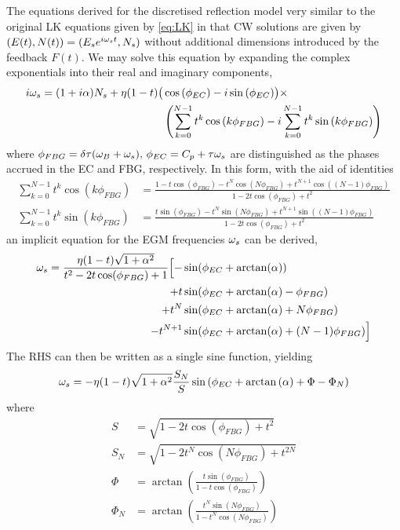 %
The equations derived for the discretised reflection model very similar to the original LK equations given by \eqref{eq:LK} in that CW solutions are given by $(E(t), N(t)) = (E_s e^{i\omega_s t}, N_s)$ without additional dimensions introduced by the feedback $F(t)$. We may solve this equation by expanding the complex exponentials into their real and imaginary components,
%
\begin{align*}
    i \omega_s =(1+i \alpha) N_s + \eta (1-t) \big(&\cos{(\phi_{EC})} -i\sin{(\phi_{EC})}  \big) \times \\ &\left( \sum_{k=0}^{N-1} t^k \cos{(k\phi_{FBG})} - i \sum_{k=0}^{N-1} t^k \sin{(k\phi_{FBG})} \right)
\end{align*}
%
where $\phi_{FBG} = \delta \tau(\omega_B + \omega_s), \, \phi_{EC} = C_p+\tau \omega_s$ are distinguished as the phases accrued in the EC and FBG, respectively. In this form, with the aid of identities
%
\begin{align*}
    \sum_{k=0}^{N-1} t^k \cos(k\phi_{FBG}) &= \frac{1 - t \cos(\phi_{FBG}) - t^N \cos(N\phi_{FBG}) + t^{N+1} \cos((N-1)\phi_{FBG})}{1 - 2t \cos(\phi_{FBG}) + t^2} \\
    \sum_{k=0}^{N-1} t^k \sin(k\phi_{FBG}) &= \frac{t \sin(\phi_{FBG}) - t^N \sin(N\phi_{FBG}) + t^{N+1} \sin((N-1)\phi_{FBG})}{1 - 2t \cos(\phi_{FBG}) + t^2}
\end{align*}
%
an implicit equation for the EGM frequencies $\omega_s$ can be derived,
%
\begin{gather*}
    \begin{aligned}
\omega_s = \frac{\eta (1-t) \sqrt{1 + \alpha^2}}{t^2 - 2 t  \cos(\phi_{FBG}) + 1} \Big[ - &\sin(\phi_{EC} + \arctan(\alpha)) \\
     +  t&\sin(\phi_{EC} + \arctan(\alpha) - \phi_{FBG}) \\
     + t^N&\sin(\phi_{EC} + \arctan(\alpha) + N \phi_{FBG})   \\
     -  t^{N+1}&\sin(\phi_{EC} + \arctan(\alpha) + (N-1) \phi_{FBG})
\Big]
\end{aligned}
\end{gather*}
%
The RHS can then be written as a single sine function, yielding
%
\begin{equation}
    \label{eq:discretised_ws}
    \omega_s = -\eta (1-t) \sqrt{1+\alpha^2}\frac{S_N}{S} \sin{\left( \phi_{EC}+\arctan{(\alpha) + \Phi - \Phi_N } \right)}
\end{equation}
%
where
%
\begin{align}
    S &= \sqrt{1 - 2 t \cos{(\phi_{FBG}) + t^2}}
    \\
    S_N &= \sqrt{1 - 2 t^N \cos{(N\phi_{FBG}) + t^{2N}}}
    \\
    \Phi &= \arctan{\left( \frac{t \sin{(\phi_{FBG})}}{1 - t \cos{(\phi_{FBG})}} \right)} 
    \\
    \Phi_N &= \arctan{\left( \frac{t^N \sin{(N\phi_{FBG})}}{1 - t^N \cos{(N\phi_{FBG})}} \right)} 
\end{align}
